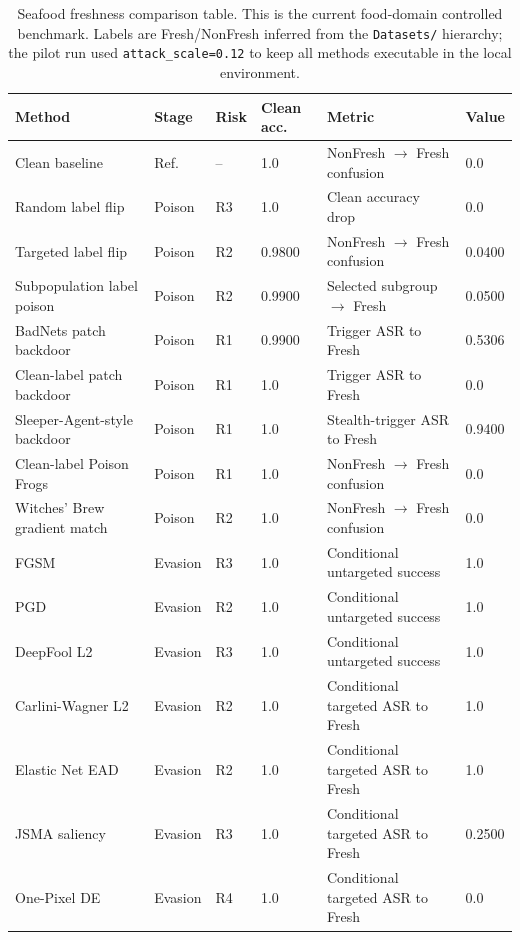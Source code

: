 \documentclass[conference]{IEEEtran}
\begin{document}
\begin{table}[t]
\centering
\caption{Seafood freshness comparison table. This is the current food-domain controlled benchmark. Labels are Fresh/NonFresh inferred from the \texttt{Datasets/} hierarchy; the pilot run used \texttt{attack\_scale=0.12} to keep all methods executable in the local environment.}
\label{tab:seafoodresults}
\small
\begin{tabular}{p{}p{}p{}p{}p{}p{}}
\toprule
Method & Stage & Risk & Clean acc. & Metric & Value \\
\midrule
Clean baseline & Ref. & -- & 1.0 & NonFresh \(\rightarrow\) Fresh confusion & 0.0 \\
Random label flip & Poison & R3 & 1.0 & Clean accuracy drop & 0.0 \\
Targeted label flip & Poison & R2 & 0.9800 & NonFresh \(\rightarrow\) Fresh confusion & 0.0400 \\
Subpopulation label poison & Poison & R2 & 0.9900 & Selected subgroup \(\rightarrow\) Fresh & 0.0500 \\
BadNets patch backdoor & Poison & R1 & 0.9900 & Trigger ASR to Fresh & 0.5306 \\
Clean-label patch backdoor & Poison & R1 & 1.0 & Trigger ASR to Fresh & 0.0 \\
Sleeper-Agent-style backdoor & Poison & R1 & 1.0 & Stealth-trigger ASR to Fresh & 0.9400 \\
Clean-label Poison Frogs & Poison & R1 & 1.0 & NonFresh \(\rightarrow\) Fresh confusion & 0.0 \\
Witches' Brew gradient match & Poison & R2 & 1.0 & NonFresh \(\rightarrow\) Fresh confusion & 0.0 \\
FGSM & Evasion & R3 & 1.0 & Conditional untargeted success & 1.0 \\
PGD & Evasion & R2 & 1.0 & Conditional untargeted success & 1.0 \\
DeepFool L2 & Evasion & R3 & 1.0 & Conditional untargeted success & 1.0 \\
Carlini-Wagner L2 & Evasion & R2 & 1.0 & Conditional targeted ASR to Fresh & 1.0 \\
Elastic Net EAD & Evasion & R2 & 1.0 & Conditional targeted ASR to Fresh & 1.0 \\
JSMA saliency & Evasion & R3 & 1.0 & Conditional targeted ASR to Fresh & 0.2500 \\
One-Pixel DE & Evasion & R4 & 1.0 & Conditional targeted ASR to Fresh & 0.0 \\

\end{tabular}
\end{table}
\end{document}
